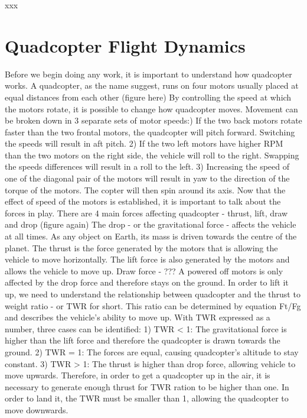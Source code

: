 xxx

\section{Quadcopter Flight Dynamics}
Before we begin doing any work, it is important to understand how quadcopter works. A quadcopter, as the name suggest, runs on four motors usually placed at equal distances from each other (figure here) \newline
By controlling the speed at which the motors rotate, it is possible to change how quadcopter moves. Movement can be broken down in 3 separate sets of motor speeds:) If the two back motors rotate faster than the two frontal motors, the quadcopter will pitch forward. Switching the speeds will result in aft pitch.
2) If the two left motors have higher RPM than the two motors on the right side, the vehicle will roll to the right. Swapping the speeds differences will result in a roll to the left.
3) Increasing the speed of one of the diagonal pair of the motors will result in yaw to the direction of the torque of the motors. The copter will then spin around its axis.\newline
Now that the effect of speed of the motors is established, it is important to talk about the forces in play. There are 4 main forces affecting quadcopter - thrust, lift, draw and drop (figure again)\newline
The drop - or the gravitational force - affects the vehicle at all times. As any object on Earth, its mass is driven towards the centre of the planet.\newline
The thrust is the force generated by the motors that is allowing the vehicle to move horizontally.\newline
The lift force is also generated by the motors and allows the vehicle to move up.\newline
Draw force - ???\newline
A powered off motors is only affected by the drop force and therefore stays on the ground. In order to lift it up, we need to understand the relationship between quadcopter and the thrust to weight ratio - or TWR for short. This ratio can be determined by equation Ft/Fg and describes the vehicle's ability to move up. With TWR expressed as a number, three cases can be identified:
1) TWR < 1: The gravitational force is higher than the lift force and therefore the quadcopter is drawn towards the ground.
2) TWR = 1: The forces are equal, causing quadcopter's altitude to stay constant.
3) TWR > 1: The thrust is higher than drop force, allowing vehicle to move upwards.\newline
Therefore, in order to get a quadcopter up in the air, it is necessary to generate enough thrust for TWR ration to be higher than one. In order to land it, the TWR must be smaller than 1, allowing the quadcopter to move downwards.\newline



